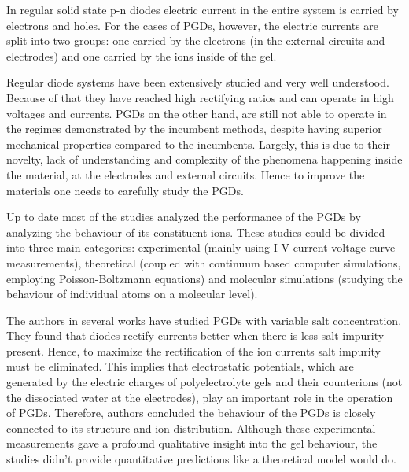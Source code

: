 \documentclass[twoside,twocolumn,9pt]{article}
\begin{document}

In regular solid state p-n diodes electric current in the entire system is carried by electrons and holes. For the cases of PGDs, however, the electric currents are split into two groups: one carried by the electrons (in  the external circuits and electrodes) and one carried by the ions inside of the gel. 

Regular diode systems have been extensively studied and very well understood. Because of that they have reached high rectifying ratios and can operate in high voltages and currents. PGDs on the other hand, are still not able to operate in the regimes demonstrated by the incumbent methods, despite having superior mechanical properties compared to the incumbents. Largely, this is due to their novelty, lack of understanding and complexity of the phenomena happening inside the material, at the electrodes and external circuits. Hence to improve the materials one needs to carefully study the PGDs. 


Up to date most of the studies analyzed the performance of the PGDs by analyzing the behaviour of its constituent ions. These studies could be divided into three main categories: experimental (mainly using I-V current-voltage curve measurements), theoretical (coupled with continuum based computer simulations, employing Poisson-Boltzmann equations) and molecular simulations (studying the behaviour of individual atoms on a molecular level).



The authors in several works \cite{So2012IonicElectrodes,Vlassiouk2008NanofluidicSolutions,Zhang2012FlexibleCellulose,Han2009IonicMicrochip} have studied PGDs with variable salt concentration. They found that diodes rectify currents better when there is less salt impurity present. Hence, to maximize the rectification of the ion currents salt impurity must be eliminated. This implies that electrostatic potentials, which are generated by the electric charges of polyelectrolyte gels and their counterions (not the dissociated water at the electrodes), play an important role in the operation of PGDs. Therefore, authors concluded the behaviour of the PGDs  is closely connected to its structure and ion distribution. Although these experimental measurements gave a profound qualitative insight into the gel behaviour, the studies didn't provide quantitative predictions like a theoretical model would do.
\end{document}
